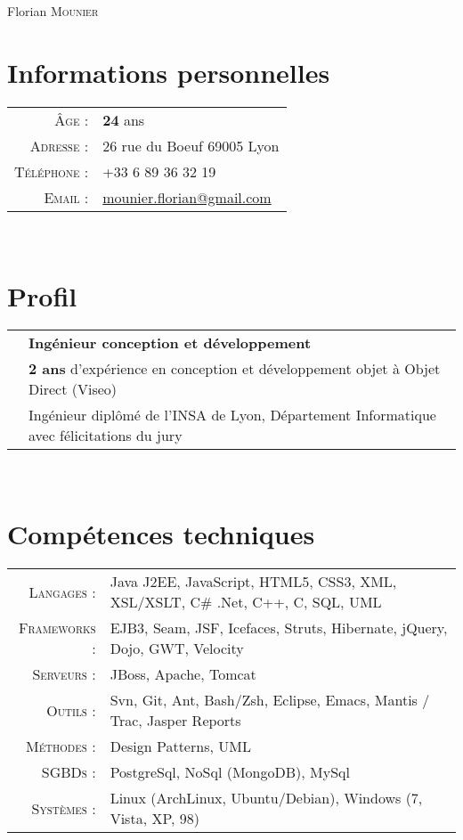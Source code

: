 \documentclass[a4paper,10pt]{article}
\begin{document}
\pagestyle{empty}
\par{\centering
  {\Huge Florian \textsc{Mounier}
  }\bigskip\par}

\section{Informations personnelles}
\begin{tabular}{rl}
  \textsc{Âge :}        & \textbf{24} ans                                                    \\
  \textsc{Adresse :}    & 26 rue du Boeuf 69005 Lyon                                         \\
  \textsc{Téléphone :}  & +33 6 89 36 32 19                                                  \\
  \textsc{Email :}      & \href{mailto:mounier.florian@gmail.com}{mounier.florian@gmail.com} \\
\end{tabular}
\\
\section{Profil}
\begin{tabular}{rl}
  & \textbf {Ingénieur conception et développement}                                          \\
  & \textbf{2 ans} d'expérience en conception et développement objet à Objet Direct (Viseo)  \\
  & Ingénieur diplômé de l'INSA de Lyon, Département Informatique avec félicitations du jury \\
\end{tabular}
\\
\section{Compétences techniques}
\begin{tabular}{rl}
  \textsc{Langages :}        & Java J2EE, JavaScript, HTML5, CSS3, XML, XSL/XSLT, C\# .Net, C++, C, SQL, UML \\
  \textsc{Frameworks :}      & EJB3, Seam, JSF, Icefaces, Struts, Hibernate, jQuery, Dojo, GWT, Velocity     \\
  \textsc{Serveurs :}        & JBoss, Apache, Tomcat                                                         \\
  \textsc{Outils :}          & Svn, Git, Ant, Bash/Zsh, Eclipse, Emacs, Mantis / Trac, Jasper Reports        \\
  \textsc{Méthodes :}        & Design Patterns, UML                                                          \\
  \textsc{SGBDs :}           & PostgreSql, NoSql (MongoDB), MySql                                            \\
  \textsc{Systèmes :}        & Linux (ArchLinux, Ubuntu/Debian), Windows (7, Vista, XP, 98)                  \\
\end{tabular}
\\
\end{document}
